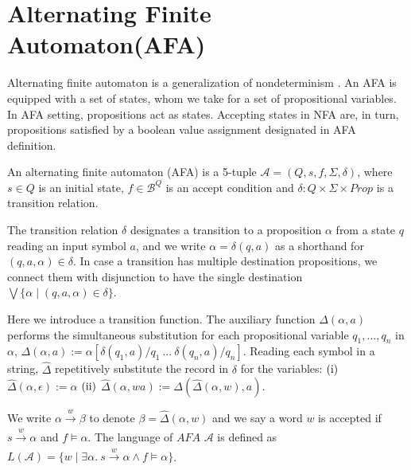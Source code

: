 \section{Alternating Finite Automaton(AFA)}

Alternating finite automaton is a generalization of
nondeterminism \cite{Yu1997}. An AFA is equipped with a set of
states, whom we take for a set of propositional variables. In AFA setting,
propositions act as states. Accepting states in NFA are, in turn, propositions
satisfied by a boolean value assignment designated in AFA definition.

\begin{definition}
An alternating finite automaton (AFA) is a 5-tuple \( \mathcal{A} = (Q, s, f,
\Sigma, \delta) \), where \( s \in Q \) is an initial state, \( f \in
\mathcal{B}^Q \) is an accept condition and \( \delta: Q \times \Sigma \times
\mathit{Prop} \) is a transition relation.
\end{definition}

The transition relation \( \delta \) designates a transition to a proposition \(
\alpha \) from a state \( q \) reading an input symbol \( a \), and we write \(
\alpha = \delta(q, a) \) as a shorthand for \( (q, a, \alpha) \in \delta \). In
case a transition has multiple destination propositions, we connect them with
disjunction to have the single destination \( \bigvee \{ \alpha \mid (q, a,
\alpha) \in \delta \} \).

Here we introduce a transition function. The auxiliary function \(
\Delta(\alpha, a) \) performs the simultaneous substitution for each
propositional variable \( q_1, ..., q_n \) in \( \alpha \), \( \Delta(\alpha, a)
:= \alpha[\delta(q_1, a)/q_1 \ ...\ \delta(q_n, a)/q_n] \). Reading each symbol
in a string, \( \hat{ \Delta } \) repetitively substitute the record in \(
\delta \) for the variables: \( (\rm i) \) \( \hat{\Delta}(\alpha, \epsilon) :=
\alpha \) \( (\rm ii) \) \( \hat{\Delta}(\alpha, wa) :=
\Delta(\hat{\Delta}(\alpha, w), a) \).

We write \( \alpha \xrightarrow[]w \beta \) to denote \( \beta =
\hat{\Delta}(\alpha, w) \) and we say a word \( w \) is accepted if \( s
\xrightarrow[]w \alpha \) and \( f \models \alpha \).  The language of \(
\mathit{AFA} \) \( \mathcal{A} \) is defined as \( L(\mathcal{A}) = \{ w \mid
\exists \alpha .\ s \xrightarrow[]w \alpha \wedge f \models \alpha \} \).

